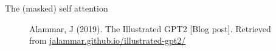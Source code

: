 \documentclass[10pt]{beamer}
\begin{document}
\begin{frame}{The (masked) self attention}
\begin{figure}[h]

\caption{Alammar, J (2019). The Illustrated GPT2 [Blog post]. Retrieved from \href{https://jalammar.github.io/illustrated-gpt2/}{jalammar.github.io/illustrated-gpt2/}
}
\end{figure}

\end{frame}
\end{document}
